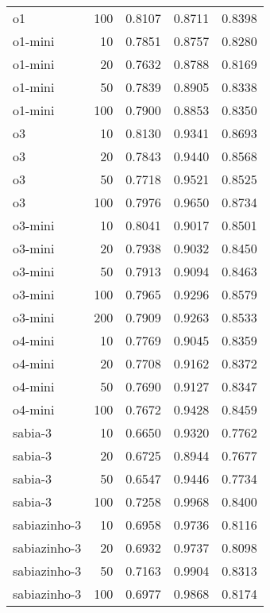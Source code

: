 \begin{tabular}{lrrrr}
o1 & 100 & 0.8107 & 0.8711 & 0.8398 \\
o1-mini & 10 & 0.7851 & 0.8757 & 0.8280 \\
o1-mini & 20 & 0.7632 & 0.8788 & 0.8169 \\
o1-mini & 50 & 0.7839 & 0.8905 & 0.8338 \\
o1-mini & 100 & 0.7900 & 0.8853 & 0.8350 \\
o3 & 10 & 0.8130 & 0.9341 & 0.8693 \\
o3 & 20 & 0.7843 & 0.9440 & 0.8568 \\
o3 & 50 & 0.7718 & 0.9521 & 0.8525 \\
o3 & 100 & 0.7976 & 0.9650 & 0.8734 \\
o3-mini & 10 & 0.8041 & 0.9017 & 0.8501 \\
o3-mini & 20 & 0.7938 & 0.9032 & 0.8450 \\
o3-mini & 50 & 0.7913 & 0.9094 & 0.8463 \\
o3-mini & 100 & 0.7965 & 0.9296 & 0.8579 \\
o3-mini & 200 & 0.7909 & 0.9263 & 0.8533 \\
o4-mini & 10 & 0.7769 & 0.9045 & 0.8359 \\
o4-mini & 20 & 0.7708 & 0.9162 & 0.8372 \\
o4-mini & 50 & 0.7690 & 0.9127 & 0.8347 \\
o4-mini & 100 & 0.7672 & 0.9428 & 0.8459 \\
sabia-3 & 10 & 0.6650 & 0.9320 & 0.7762 \\
sabia-3 & 20 & 0.6725 & 0.8944 & 0.7677 \\
sabia-3 & 50 & 0.6547 & 0.9446 & 0.7734 \\
sabia-3 & 100 & 0.7258 & 0.9968 & 0.8400 \\
sabiazinho-3 & 10 & 0.6958 & 0.9736 & 0.8116 \\
sabiazinho-3 & 20 & 0.6932 & 0.9737 & 0.8098 \\
sabiazinho-3 & 50 & 0.7163 & 0.9904 & 0.8313 \\
sabiazinho-3 & 100 & 0.6977 & 0.9868 & 0.8174 \\
\bottomrule
\end{tabular}
